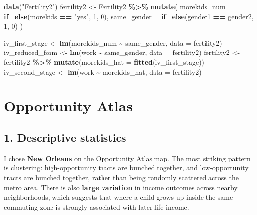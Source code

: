 \documentclass[
]{article}
\newenvironment{Shaded}{\begin{snugshade}}{\end{snugshade}}
\newcommand{\AttributeTok}[1]{\textcolor[rgb]{0.13,0.29,0.53}{#1}}
\newcommand{\DecValTok}[1]{\textcolor[rgb]{0.00,0.00,0.81}{#1}}
\newcommand{\FunctionTok}[1]{\textcolor[rgb]{0.13,0.29,0.53}{\textbf{#1}}}
\newcommand{\NormalTok}[1]{#1}
\newcommand{\OtherTok}[1]{\textcolor[rgb]{0.56,0.35,0.01}{#1}}
\newcommand{\SpecialCharTok}[1]{\textcolor[rgb]{0.81,0.36,0.00}{\textbf{#1}}}
\newcommand{\StringTok}[1]{\textcolor[rgb]{0.31,0.60,0.02}{#1}}
\begin{document}
\begin{Shaded}
\begin{Highlighting}[]
\FunctionTok{data}\NormalTok{(}\StringTok{"Fertility2"}\NormalTok{)}
\NormalTok{fertility2 }\OtherTok{\textless{}{-}}\NormalTok{ Fertility2 }\SpecialCharTok{\%\textgreater{}\%}
  \FunctionTok{mutate}\NormalTok{(}
    \AttributeTok{morekids\_num =} \FunctionTok{if\_else}\NormalTok{(morekids }\SpecialCharTok{==} \StringTok{"yes"}\NormalTok{, }\DecValTok{1}\NormalTok{, }\DecValTok{0}\NormalTok{),}
    \AttributeTok{same\_gender =} \FunctionTok{if\_else}\NormalTok{(gender1 }\SpecialCharTok{==}\NormalTok{ gender2, }\DecValTok{1}\NormalTok{, }\DecValTok{0}\NormalTok{)}
\NormalTok{  )}

\NormalTok{iv\_first\_stage }\OtherTok{\textless{}{-}} \FunctionTok{lm}\NormalTok{(morekids\_num }\SpecialCharTok{\textasciitilde{}}\NormalTok{ same\_gender, }\AttributeTok{data =}\NormalTok{ fertility2)}
\NormalTok{iv\_reduced\_form }\OtherTok{\textless{}{-}} \FunctionTok{lm}\NormalTok{(work }\SpecialCharTok{\textasciitilde{}}\NormalTok{ same\_gender, }\AttributeTok{data =}\NormalTok{ fertility2)}
\NormalTok{fertility2 }\OtherTok{\textless{}{-}}\NormalTok{ fertility2 }\SpecialCharTok{\%\textgreater{}\%} \FunctionTok{mutate}\NormalTok{(}\AttributeTok{morekids\_hat =} \FunctionTok{fitted}\NormalTok{(iv\_first\_stage))}
\NormalTok{iv\_second\_stage }\OtherTok{\textless{}{-}} \FunctionTok{lm}\NormalTok{(work }\SpecialCharTok{\textasciitilde{}}\NormalTok{ morekids\_hat, }\AttributeTok{data =}\NormalTok{ fertility2)}
\end{Highlighting}
\end{Shaded}

\section{Opportunity Atlas}\label{opportunity-atlas}

\subsection{1. Descriptive statistics}\label{descriptive-statistics}

I chose \textbf{New Orleans} on the Opportunity Atlas map. The most
striking pattern is clustering: high-opportunity tracts are bunched
together, and low-opportunity tracts are bunched together, rather than
being randomly scattered across the metro area. There is also
\textbf{large variation} in income outcomes across nearby neighborhoods,
which suggests that where a child grows up inside the same commuting
zone is strongly associated with later-life income.
\end{document}
